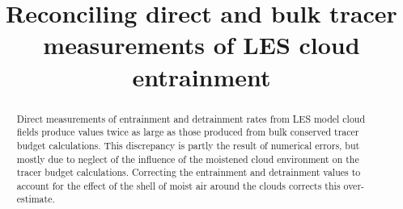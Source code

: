 \documentclass[draft,grl]{agutex}
\begin{document}
%
%


\title{Reconciling direct and bulk tracer measurements of LES cloud entrainment}
%

%
%






%
%


\begin{abstract}
Direct measurements of entrainment and detrainment rates from LES model 
cloud fields produce values twice as large as those produced from bulk 
conserved tracer budget calculations.  This discrepancy is partly the 
result of numerical errors, but mostly due to neglect of the influence of 
the moistened cloud environment on the tracer budget calculations.  
Correcting the entrainment and detrainment values to account for the effect 
of the shell of moist air around the clouds corrects this over-estimate.  
\end{abstract}

%
%

%
\end{document}
